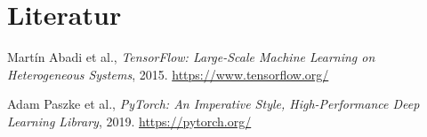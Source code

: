 \documentclass[a4paper, 11pt]{scrartcl}
\begin{document}
\section{Literatur}
\begin{thebibliography}{99}

Martín Abadi et al., \emph{TensorFlow: Large-Scale Machine Learning on Heterogeneous Systems}, 2015.  
\url{https://www.tensorflow.org/}

Adam Paszke et al., \emph{PyTorch: An Imperative Style, High-Performance Deep Learning Library}, 2019.  
\url{https://pytorch.org/}

\end{thebibliography}
\end{document}
